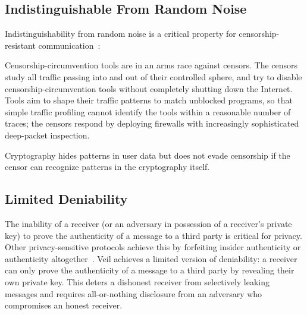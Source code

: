 \subsection{Indistinguishable From Random Noise}\label{subsec:security-indistinguishable}

Indistinguishability from random noise is a critical property for censorship-resistant
communication~\cite{bernstein2013}\@:

\begin{displayquote}
    Censorship-circumvention tools are in an arms race against censors.
    The censors study all traffic passing into and out of their controlled sphere, and try to disable
    censorship-circumvention tools without completely shutting down the Internet.
    Tools aim to shape their traffic patterns to match unblocked programs, so that simple traffic profiling cannot
    identify the tools within a reasonable number of traces;
    the censors respond by deploying firewalls with increasingly sophisticated deep-packet inspection.

    Cryptography hides patterns in user data but does not evade censorship if the censor can recognize patterns in the
    cryptography itself.
\end{displayquote}

\subsection{Limited Deniability}\label{subsec:security-deniability}

The inability of a receiver (or an adversary in possession of a receiver's private key) to prove the authenticity of a
message to a third party is critical for privacy.
Other privacy-sensitive protocols achieve this by forfeiting insider authenticity or authenticity
altogether~\cite{borisov2004}\@.
Veil achieves a limited version of deniability: a receiver can only prove the authenticity of a message to
a third party by revealing their own private key.
This deters a dishonest receiver from selectively leaking messages and requires all-or-nothing disclosure from an
adversary who compromises an honest receiver.
